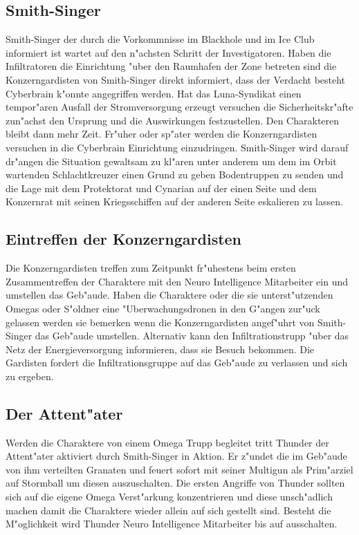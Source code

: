 \subsection{Smith-Singer} 
Smith-Singer der durch die Vorkommnisse im Blackhole und im Ice Club informiert ist wartet auf den n"achsten Schritt der Investigatoren. Haben die Infiltratoren die Einrichtung "uber den Raumhafen der Zone betreten sind die Konzerngardisten von Smith-Singer direkt informiert, dass der Verdacht besteht Cyberbrain k"onnte angegriffen werden. Hat das Luna-Syndikat einen tempor"aren Ausfall der Stromversorgung erzeugt versuchen die Sicherheitskr"afte zun"achst den Ursprung und die Auswirkungen festzustellen. Den Charakteren bleibt dann mehr Zeit. Fr"uher oder sp"ater werden die Konzerngardisten versuchen in die Cyberbrain Einrichtung einzudringen. Smith-Singer wird darauf dr"angen die Situation gewaltsam zu kl"aren unter anderem um dem im Orbit wartenden Schlachtkreuzer einen Grund zu geben Bodentruppen zu senden und die Lage mit dem Protektorat und Cynarian auf der einen Seite und dem Konzernrat mit seinen Kriegsschiffen auf der anderen Seite eskalieren zu lassen. 

\subsection{Eintreffen der Konzerngardisten} 
Die Konzerngardisten treffen zum Zeitpunkt fr"uhestens beim ersten Zusammentreffen der Charaktere mit den Neuro Intelligence Mitarbeiter ein und umstellen das Geb"aude. Haben die Charaktere oder die sie unterst"utzenden Omegas oder S"oldner eine "Uberwachungsdronen in den G"angen zur"uck gelassen werden sie bemerken wenn die Konzerngardisten angef"uhrt von Smith-Singer das Geb"aude umstellen. Alternativ kann \xl{} den Infiltrationstrupp "uber das Netz der Energieversorgung informieren, dass sie Besuch bekommen. Die Gardisten fordert die Infiltrationsgruppe auf das Geb"aude zu verlassen und sich zu ergeben. 

\subsection{Der Attent"ater} 
Werden die Charaktere von einem Omega Trupp begleitet tritt Thunder der Attent"ater aktiviert durch 
Smith-Singer in Aktion. Er z"undet die im Geb"aude von ihm verteilten Granaten und feuert sofort mit seiner Multigun als Prim"arziel auf Stormball um diesen auszuschalten. Die ersten Angriffe von Thunder sollten sich auf die eigene Omega Verst"arkung konzentrieren und diese
unsch"adlich machen damit die Charaktere wieder allein auf sich gestellt sind. Besteht die M"oglichkeit wird Thunder Neuro Intelligence Mitarbeiter bis auf \ml{} ausschalten.

